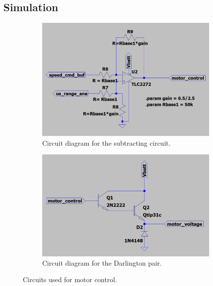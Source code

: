 \subsection{Simulation}
\begin{figure}[H]
\centering
\begin{subfigure}[]{0.4\textwidth}
\includegraphics[width=\linewidth]{./Figures/Mtr_Ctrl_Sub_Cir.png}
\caption{Circuit diagram for the subtracting circuit.}
\label{subfig:mtrctrl_sub_cir}	
\end{subfigure}
\hfill
\begin{subfigure}[]{0.4\textwidth}
\includegraphics[width=\linewidth]{./Figures/Mtr_Ctrl_Darling_Cir.png}
\caption{Circuit diagram for the Darlington pair.} 			
\label{subfig:mtrctrl_darling_cir}	
\end{subfigure}
\caption{Circuits used for motor control.}
\label{fig:mtrctrl_cir}
\end{figure}

